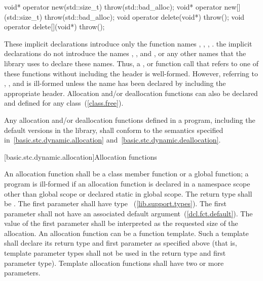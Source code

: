 \begin{codeblock}
void* operator new(std::size_t) throw(std::bad_alloc);
void* operator new[](std::size_t) throw(std::bad_alloc);
void operator delete(void*) throw();
void operator delete[](void*) throw();
\end{codeblock}

These implicit declarations introduce only the function names
 ,  ,
 , 
. \enternote the implicit declarations do not introduce
the names , , and
, or any other names that the library uses to
declare these names. Thus, a ,
 or function call that refers to one of
these functions without including the header  is
well-formed. However, referring to , ,
and  is ill-formed unless the name has been declared
by including the appropriate header. \exitnote Allocation and/or
deallocation functions can also be declared and defined for any
class~(\ref{class.free}).

\pnum
Any allocation and/or deallocation functions defined in a \Cpp program,
including the default versions in the library, shall conform to the
semantics specified in~\ref{basic.stc.dynamic.allocation}
and~\ref{basic.stc.dynamic.deallocation}.

[basic.stc.dynamic.allocation]{Allocation functions}

\pnum
{}%
An allocation function shall be a class member function or a global
function; a program is ill-formed if an allocation function is declared
in a namespace scope other than global scope or declared static in
global scope. The return type shall be . The first
parameter shall have type ~(\ref{lib.support.types}). The
first parameter shall not have an associated default
argument~(\ref{dcl.fct.default}). The value of the first parameter shall
be interpreted as the requested size of the allocation. An allocation
function can be a function template. Such a template shall declare its
return type and first parameter as specified above (that is, template
parameter types shall not be used in the return type and first parameter
type). Template allocation functions shall have two or more parameters.

